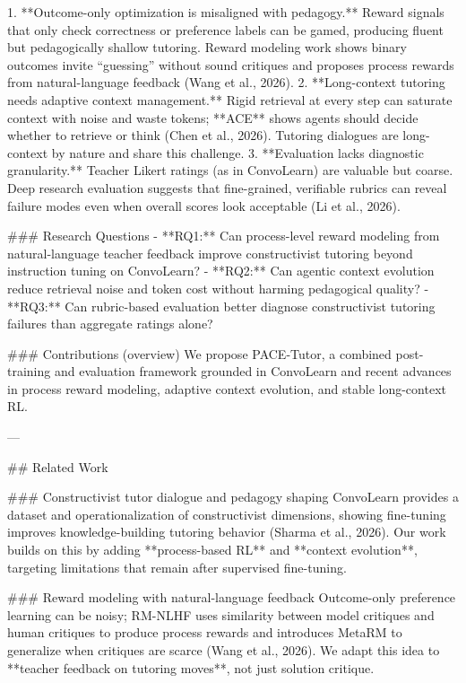 1. **Outcome-only optimization is misaligned with pedagogy.** Reward signals that only check correctness or preference labels can be gamed, producing fluent but pedagogically shallow tutoring. Reward modeling work shows binary outcomes invite “guessing” without sound critiques and proposes process rewards from natural-language feedback (Wang et al., 2026).  
2. **Long-context tutoring needs adaptive context management.** Rigid retrieval at every step can saturate context with noise and waste tokens; **ACE** shows agents should decide whether to retrieve or think (Chen et al., 2026). Tutoring dialogues are long-context by nature and share this challenge.  
3. **Evaluation lacks diagnostic granularity.** Teacher Likert ratings (as in ConvoLearn) are valuable but coarse. Deep research evaluation suggests that fine-grained, verifiable rubrics can reveal failure modes even when overall scores look acceptable (Li et al., 2026).  

### Research Questions  
- **RQ1:** Can process-level reward modeling from natural-language teacher feedback improve constructivist tutoring beyond instruction tuning on ConvoLearn?  
- **RQ2:** Can agentic context evolution reduce retrieval noise and token cost without harming pedagogical quality?  
- **RQ3:** Can rubric-based evaluation better diagnose constructivist tutoring failures than aggregate ratings alone?

### Contributions (overview)  
We propose PACE-Tutor, a combined post-training and evaluation framework grounded in ConvoLearn and recent advances in process reward modeling, adaptive context evolution, and stable long-context RL.

---

## Related Work  

### Constructivist tutor dialogue and pedagogy shaping  
ConvoLearn provides a dataset and operationalization of constructivist dimensions, showing fine-tuning improves knowledge-building tutoring behavior (Sharma et al., 2026). Our work builds on this by adding **process-based RL** and **context evolution**, targeting limitations that remain after supervised fine-tuning.

### Reward modeling with natural-language feedback  
Outcome-only preference learning can be noisy; RM-NLHF uses similarity between model critiques and human critiques to produce process rewards and introduces MetaRM to generalize when critiques are scarce (Wang et al., 2026). We adapt this idea to **teacher feedback on tutoring moves**, not just solution critique.


